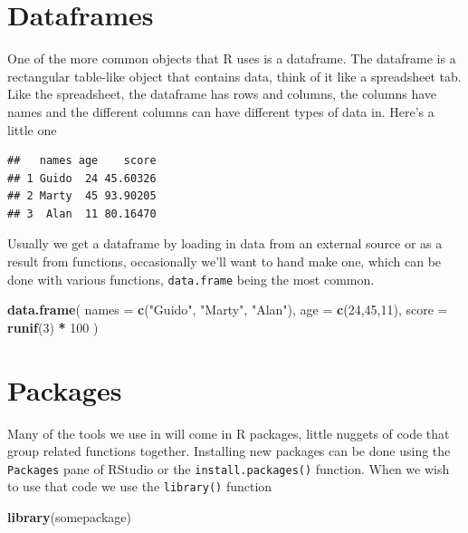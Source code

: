 \documentclass[
]{book}
\newenvironment{Shaded}{\begin{snugshade}}{\end{snugshade}}
\newcommand{\DataTypeTok}[1]{\textcolor[rgb]{0.13,0.29,0.53}{#1}}
\newcommand{\DecValTok}[1]{\textcolor[rgb]{0.00,0.00,0.81}{#1}}
\newcommand{\KeywordTok}[1]{\textcolor[rgb]{0.13,0.29,0.53}{\textbf{#1}}}
\newcommand{\NormalTok}[1]{#1}
\newcommand{\OperatorTok}[1]{\textcolor[rgb]{0.81,0.36,0.00}{\textbf{#1}}}
\newcommand{\StringTok}[1]{\textcolor[rgb]{0.31,0.60,0.02}{#1}}
\begin{document}
\hypertarget{dataframes}{%
\section{Dataframes}\label{dataframes}}

One of the more common objects that R uses is a dataframe. The dataframe is a rectangular table-like object that contains data, think of it like a spreadsheet tab. Like the spreadsheet, the dataframe has rows and columns, the columns have names and the different columns can have different types of data in. Here's a little one

\begin{verbatim}
##   names age    score
## 1 Guido  24 45.60326
## 2 Marty  45 93.90205
## 3  Alan  11 80.16470
\end{verbatim}

Usually we get a dataframe by loading in data from an external source or as a result from functions, occasionally we'll want to hand make one, which can be done with various functions, \texttt{data.frame} being the most common.

\begin{Shaded}
\begin{Highlighting}[]
\KeywordTok{data.frame}\NormalTok{(}
  \DataTypeTok{names =} \KeywordTok{c}\NormalTok{(}\StringTok{"Guido"}\NormalTok{, }\StringTok{"Marty"}\NormalTok{, }\StringTok{"Alan"}\NormalTok{),}
  \DataTypeTok{age =} \KeywordTok{c}\NormalTok{(}\DecValTok{24}\NormalTok{,}\DecValTok{45}\NormalTok{,}\DecValTok{11}\NormalTok{),}
  \DataTypeTok{score =} \KeywordTok{runif}\NormalTok{(}\DecValTok{3}\NormalTok{) }\OperatorTok{*}\StringTok{ }\DecValTok{100}
\NormalTok{)}
\end{Highlighting}
\end{Shaded}

\hypertarget{packages}{%
\section{Packages}\label{packages}}

Many of the tools we use in will come in R packages, little nuggets of code that group related functions together. Installing new packages can be done using the \texttt{Packages} pane of RStudio or the \texttt{install.packages()} function. When we wish to use that code we use the \texttt{library()} function

\begin{Shaded}
\begin{Highlighting}[]
\KeywordTok{library}\NormalTok{(somepackage)}
\end{Highlighting}
\end{Shaded}
\end{document}
